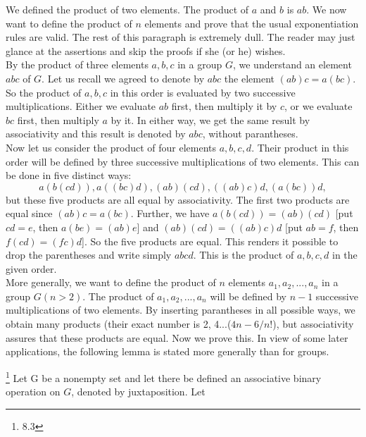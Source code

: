 \documentclass[11pt]{amsbook}
\begin{document}

We defined the product of two elements. The product of $a$ and $b$ is $ab$. We now want to define the product of $n$ elements and prove that the usual exponentiation rules are valid. The rest of this paragraph is extremely dull. The reader may just glance at the assertions and skip the proofs if she (or he) wishes.\\ 

By the product of three elements $a,b,c$ in a group $G$, we understand an element $abc$ of $G$. Let us recall we agreed to denote by $abc$ the element $(ab)c = a(bc)$. So the product of $a,b,c$ in this order is evaluated by two successive multiplications. Either we evaluate $ab$ first, then multiply it by $c$, or we evaluate $bc$ first, then multiply $a$ by it. In either way, we get the same result by associativity and this result is denoted by $abc$, without parantheses.\\

Now let us consider the product of four elements $a,b,c,d$. Their product in this order will be defined by three successive multiplications of two elements. This can be done in five distinct ways:
        $$ a(b(cd)), a((bc)d), (ab)(cd), ((ab)c)d, (a(bc))d,$$
but these five products are all equal by associativity. The first two products are equal since $(ab)c = a(bc)$. Further, we have $a(b(cd)) = (ab)(cd)$ [put $cd = e$, then $a(be) = (ab)e$] and $(ab)(cd) = ((ab)c)d$ [put $ab = f$, then $f(cd) = (fc)d$]. So the five products are equal. This renders it possible to drop the parentheses and write simply $abcd$. This is the product of $a,b,c,d$ in the given order.\\

More generally, we want to define the product of $n$ elements $a_1, a_2, ..., a_n$ in a group $G( n > 2)$. The product of $a_1, a_2, ..., a_n$ will be defined by $n -1$ successive multiplications of two elements. By inserting parantheses in all possible ways, we obtain many products (their exact number is 2, 4...($4n-6/n!$), but associativity assures that these products are equal. Now we prove this. In view of some later applications, the following lemma is stated more generally than for groups.\\


\begin{lem} \footnote{8.3}
Let G be a nonempty set and let there be defined an associative binary operation on $G$, denoted by juxtaposition. Let
\end{lem}
\end{document}
